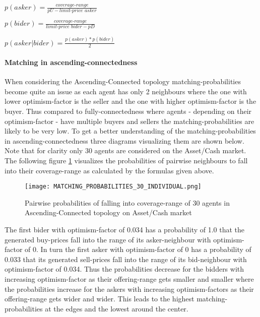 \documentclass[Bachelorarbeit.tex]{subfiles}
\begin{document}
\begin{center}
$p(asker) = \frac{\textit{coverage-range}}{ pU - \textit{limit-price asker} }$
\end{center}

\begin{center}
$p(bider) = \frac{\textit{coverage-range}}{ \textit{limit-price bider} - pD }$
\end{center}

\begin{center}
$p(asker | bider) = \frac{p(asker) * p(bider)}{2}$
\end{center}

\paragraph{Matching in ascending-connectedness}
When considering the Ascending-Connected topology matching-probabilities become quite an issue as each agent has only 2 neighbours where the one with lower optimism-factor is the seller and the one with higher optimism-factor is the buyer. Thus compared to fully-connectedness where agents - depending on their optimism-factor - have multiple buyers and sellers the matching-probabilities are likely to be very low. To get a better understanding of the matching-probabilities in ascending-connectedness three diagrams visualizing them are shown below. Note that for clarity only 30 agents are considered on the Asset/Cash market.
\medskip
The following figure \ref{fig:MATCHING_PROBABILITIES_30_INDIVIDUAL} visualizes the probabilities of pairwise neighbours to fall into their coverage-range as calculated by the formulas given above.

\begin{figure}[H]
	\centering
  \texttt{[image: MATCHING\_PROBABILITIES\_30\_INDIVIDUAL.png]}
	\caption{Pairwise probabilities of falling into coverage-range of 30 agents in Ascending-Connected topology on Asset/Cash market}
	\label{fig:MATCHING_PROBABILITIES_30_INDIVIDUAL}
\end{figure}

The first bider with optimism-factor of 0.034 has a probability of 1.0 that the generated buy-prices fall into the range of its asker-neighbour with optimism-factor of 0. In turn the first asker with optimism-factor of 0 has a probability of 0.033 that its generated sell-prices fall into the range of its bid-neighbour with optimism-factor of 0.034. Thus the probabilities decrease for the bidders with increasing optimism-factor as their offering-range gets smaller and smaller where the probabilities increase for the askers with increasing optimism-factors as their offering-range gets wider and wider. This leads to the highest matching-probabilities at the edges and the lowest around the center.
\end{document}
